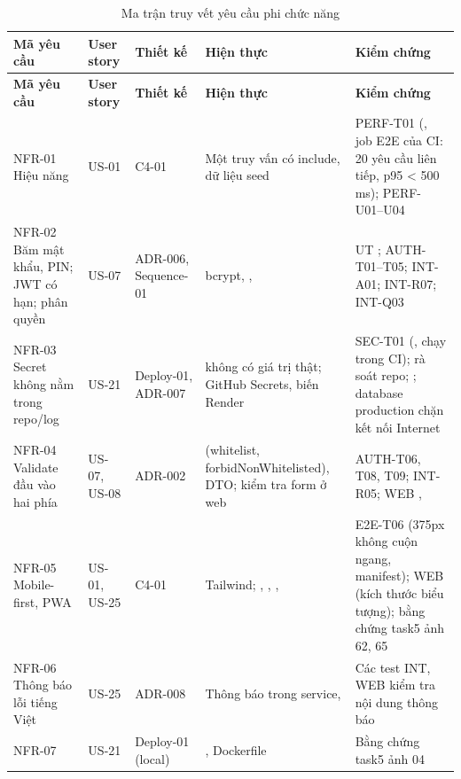 {\scriptsize
\begin{longtable}{@{}L{2.4cm}L{1.4cm}L{2cm}L{3.8cm}L{4.3cm}@{}}
\caption{Ma trận truy vết yêu cầu phi chức năng}\label{tab:tvnfr}\\
\toprule
\textbf{Mã yêu cầu} & \textbf{User story} & \textbf{Thiết kế} & \textbf{Hiện thực} & \textbf{Kiểm chứng} \\ \midrule \endfirsthead
\toprule \textbf{Mã yêu cầu} & \textbf{User story} & \textbf{Thiết kế} & \textbf{Hiện thực} & \textbf{Kiểm chứng} \\ \midrule \endhead
\bottomrule \endfoot
NFR-01 Hiệu năng  & US-01 & C4-01 & Một truy vấn có include, dữ liệu seed & PERF-T01 (, job E2E của CI: 20 yêu cầu liên tiếp, p95 < 500 ms); PERF-U01--U04 \\
NFR-02 Băm mật khẩu, PIN; JWT có hạn; phân quyền & US-07 & ADR-006, Sequence-01 & bcrypt, ,  & UT ; AUTH-T01--T05; INT-A01; INT-R07; INT-Q03 \\
NFR-03 Secret không nằm trong repo/log & US-21 & Deploy-01, ADR-007 &  không có giá trị thật; GitHub Secrets, biến Render & SEC-T01 (, chạy trong CI); rà soát repo; ; database production chặn kết nối Internet \\
NFR-04 Validate đầu vào hai phía & US-07, US-08 & ADR-002 &  (whitelist, forbidNonWhitelisted), DTO; kiểm tra form ở web & AUTH-T06, T08, T09; INT-R05; WEB ,  \\
NFR-05 Mobile-first, PWA & US-01, US-25 & C4-01 & Tailwind; , , ,  & E2E-T06 (375px không cuộn ngang, manifest); WEB  (kích thước biểu tượng); bằng chứng task5 ảnh 62, 65 \\
NFR-06 Thông báo lỗi tiếng Việt & US-25 & ADR-008 & Thông báo trong service,  & Các test INT, WEB kiểm tra nội dung thông báo \\
NFR-07  & US-21 & Deploy-01 (local) & , Dockerfile & Bằng chứng task5 ảnh 04 \\

\end{longtable}}
